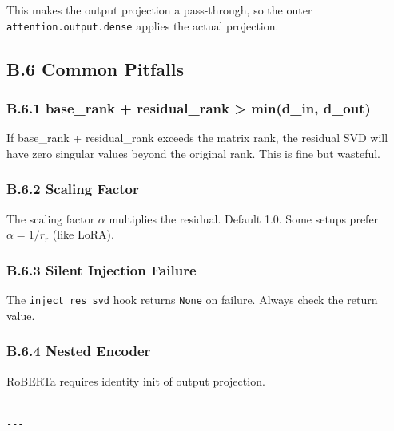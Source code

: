 This makes the output projection a pass-through, so the outer 
\texttt{attention.output.dense} applies the actual projection.

\subsection{B.6 Common Pitfalls}

\subsubsection{B.6.1 base\_rank + residual\_rank > min(d\_in, d\_out)}

If base\_rank + residual\_rank exceeds the matrix rank, the residual SVD 
will have zero singular values beyond the original rank. This is fine 
but wasteful.

\subsubsection{B.6.2 Scaling Factor}

The scaling factor $\alpha$ multiplies the residual. Default 1.0. Some 
setups prefer $\alpha = 1/r_r$ (like LoRA).

\subsubsection{B.6.3 Silent Injection Failure}

The \texttt{inject\_res\_svd} hook returns \texttt{None} on failure. Always check the 
return value.

\subsubsection{B.6.4 Nested Encoder}

RoBERTa requires identity init of output projection.
\begin{lstlisting}

---
\end{lstlisting}
